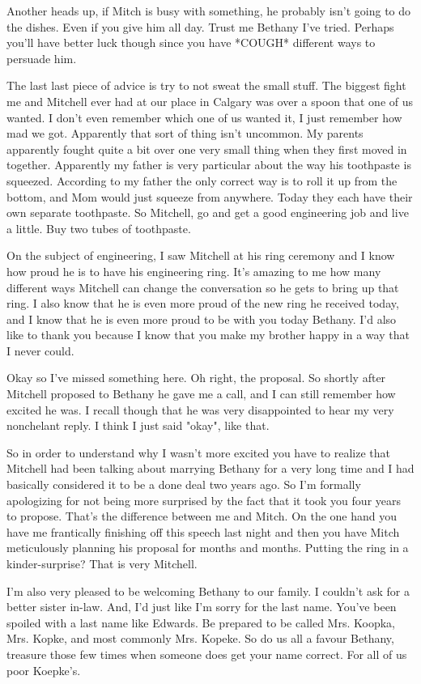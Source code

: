 Another heads up, if Mitch is busy with something, he probably isn't going to do the dishes. Even if you give him all day. Trust me Bethany I've tried. Perhaps you'll have better luck though since you have *COUGH* different ways to persuade him.

The last last piece of advice is try to not sweat the small stuff. The biggest fight me and Mitchell ever had at our place in Calgary was over a spoon that one of us wanted. I don't even remember which one of us wanted it, I just remember how mad we got. Apparently that sort of thing isn't uncommon. My parents apparently fought quite a bit over one very small thing when they first moved in together. Apparently my father is very particular about the way his toothpaste is squeezed. According to my father the only correct way is to roll it up from the bottom, and Mom would just squeeze from anywhere. Today they each have their own separate toothpaste. So Mitchell, go and get a good engineering job and live a little. Buy two tubes of toothpaste.

On the subject of engineering, I saw Mitchell at his ring ceremony and I know how proud he is to have his engineering ring. It's amazing to me how many different ways Mitchell can change the conversation so he gets to bring up that ring. I also know that he is even more proud of the new ring he received today, and I know that he is even more proud to be with you today Bethany. I'd also like to thank you because I know that you make my brother happy in a way that I never could.

Okay so I've missed something here. Oh right, the proposal. So shortly after Mitchell proposed to Bethany he gave me a call, and I can still remember how excited he was. I recall though that he was very disappointed to hear my very nonchelant reply. I think I just said "okay", like that.

So in order to understand why I wasn't more excited you have to realize that Mitchell had been talking about marrying Bethany for a very long time and I had basically considered it to be a done deal two years ago. So I'm formally apologizing for not being more surprised by the fact that it took you four years to propose. That's the difference between me and Mitch. On the one hand you have me frantically finishing off this speech last night and then you have Mitch meticulously planning his proposal for months and months. Putting the ring in a kinder-surprise? That is very Mitchell.

I'm also very pleased to be welcoming Bethany to our family. I couldn't ask for a better sister in-law. And, I'd just like I'm sorry for the last name. You've been spoiled with a last name like Edwards. Be prepared to be called Mrs. Koopka, Mrs. Kopke, and most commonly Mrs. Kopeke. So do us all a favour Bethany, treasure those few times when someone does get your name correct. For all of us poor Koepke's.

